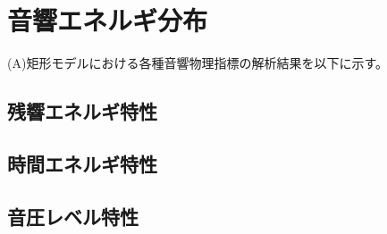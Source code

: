 \chapter{音響エネルギ分布}

(A)矩形モデルにおける各種音響物理指標の解析結果を以下に示す。



\section{残響エネルギ特性}
\section{時間エネルギ特性}
\section{音圧レベル特性}
